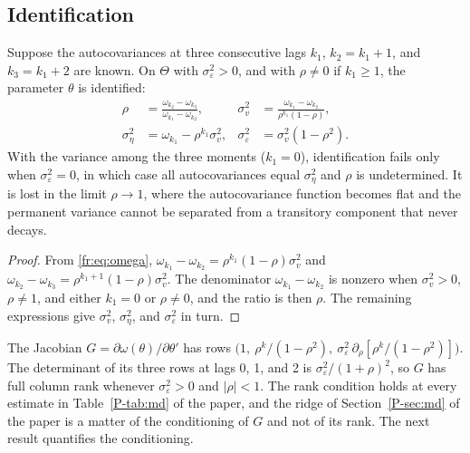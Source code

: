 \subsection{Identification}

\begin{proposition}
\label{fr:prop:ident}
Suppose the autocovariances at three consecutive lags $k_1$,
$k_2 = k_1 + 1$, and $k_3 = k_1 + 2$ are known. On $\Theta$ with
$\sigma^2_\varepsilon > 0$, and with $\rho \ne 0$ if $k_1 \ge 1$, the
parameter $\theta$ is identified:
\begin{equation}
\begin{aligned}
\rho &= \frac{\omega_{k_2} - \omega_{k_3}}{\omega_{k_1} - \omega_{k_2}}, &
\sigma^2_v &= \frac{\omega_{k_1} - \omega_{k_2}}{\rho^{k_1}(1 - \rho)}, \\
\sigma^2_\eta &= \omega_{k_1} - \rho^{k_1}\sigma^2_v, &
\sigma^2_\varepsilon &= \sigma^2_v(1-\rho^2).
\end{aligned}
\label{fr:eq:ident}
\end{equation}
With the variance among the three moments ($k_1 = 0$), identification
fails only when $\sigma^2_\varepsilon = 0$, in which case all
autocovariances equal $\sigma^2_\eta$ and $\rho$ is undetermined. It is
lost in the limit $\rho \to 1$, where the autocovariance function becomes
flat and the permanent variance cannot be separated from a transitory
component that never decays.
\end{proposition}

\begin{proof}
From \eqref{fr:eq:omega},
$\omega_{k_1} - \omega_{k_2} = \rho^{k_1}(1-\rho)\sigma^2_v$ and
$\omega_{k_2} - \omega_{k_3} = \rho^{k_1+1}(1-\rho)\sigma^2_v$. The
denominator $\omega_{k_1} - \omega_{k_2}$ is nonzero when
$\sigma^2_v > 0$, $\rho \ne 1$, and either $k_1 = 0$ or $\rho \ne 0$, and
the ratio is then $\rho$. The remaining expressions give $\sigma^2_v$,
$\sigma^2_\eta$, and $\sigma^2_\varepsilon$ in turn.
\end{proof}

The Jacobian $G = \partial\omega(\theta)/\partial\theta'$ has rows
$\big(1,\ \rho^k/(1-\rho^2),\ \sigma^2_\varepsilon\,\partial_\rho[\rho^k/(1-\rho^2)]\big)$.
The determinant of its three rows at lags 0, 1, and 2 is
$\sigma^2_\varepsilon/(1+\rho)^2$, so $G$ has full column rank whenever
$\sigma^2_\varepsilon > 0$ and $|\rho| < 1$. The rank condition holds at
every estimate in Table~\ref{P-tab:md} of the paper, and the ridge of
Section~\ref{P-sec:md} of the paper is a matter of the conditioning of $G$
and not of its rank. The next result quantifies the conditioning.

